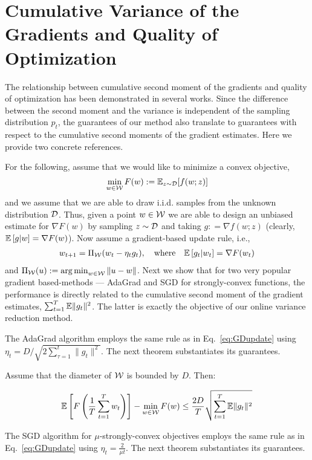 

\newpage
\appendix
\section{Cumulative Variance of the Gradients and Quality of Optimization}  \label{appendix:cumulvariance}
The relationship between cumulative second moment of the gradients and quality of optimization has been demonstrated in several works. Since the difference between the second moment and the variance is independent of the sampling distribution $p_t$, the guarantees of our method also translate to guarantees with respect to the cumulative second moments of the gradient estimates. Here we provide two concrete references.

For the following, assume that we would like to minimize a convex objective,
$$
\min_{w\in\mathcal{W}}F(w): = \mathbb{E}_{z\sim {\mathcal{D}}}[f(w;z)]
$$
and we assume that we are able to draw i.i.d. samples from the unknown distribution ${\mathcal{D}}$.
Thus, given a point $w\in\mathcal{W}$ we are able to design an unbiased estimate for $\nabla F(w)$ by sampling $z\sim{\mathcal{D}}$ and taking $g: = \nabla f(w;z)$ (clearly,
$
\mathbb{E}\left[ g\vert w \right] = \nabla F(w)
$).
Now assume a gradient-based update rule, i.e.,
\begin{align}\label{eq:GDupdate}
w_{t+1} = \Pi_{\mathcal{W}}(w_t -\eta_t g_t),\quad \text{where}~~~\mathbb{E}\left[ g_t\vert w_t \right] = \nabla F(w_t)
\end{align}
and $\Pi_{\mathcal{W}}(u): = \operatorname*{arg\,min}_{w\in\mathcal{W}}\|u-w\|$.
Next we  show that for two very popular gradient based-methods --- AdaGrad and SGD for strongly-convex functions, the performance is directly related to the cumulative second moment of the gradient estimates, $\sum_{t=1}^T \mathbb{E}\|g_t\|^2$. The latter is exactly the objective of our online variance reduction method.

The AdaGrad algorithm employs the same rule as in Eq.~\eqref{eq:GDupdate} using
$\eta_t = D/\sqrt{2\sum_{\tau=1}^t \|g_t\|^2}$. The next theorem substantiates its guarantees.
\begin{theorem} Assume that the diameter of $\mathcal{W}$ is bounded by $D$. Then:

\begin{equation*}
\mathbb{E}\left[ F\left(  \frac{1}{T} \sum_{t=1}^T  w_t  \right)  \right] - \min_{w\in\mathcal{W}}F(w) \leq \frac{2D}{ T}\sqrt{ \sum_{t=1}^T \mathbb{E}\|g_t\|^2}
\end{equation*}
\end{theorem}

The SGD algorithm for $\mu$-strongly-convex objectives employs the same rule as in Eq.~\eqref{eq:GDupdate} using
$\eta_t = \frac{2}{\mu t}$. The next theorem substantiates its guarantees.




